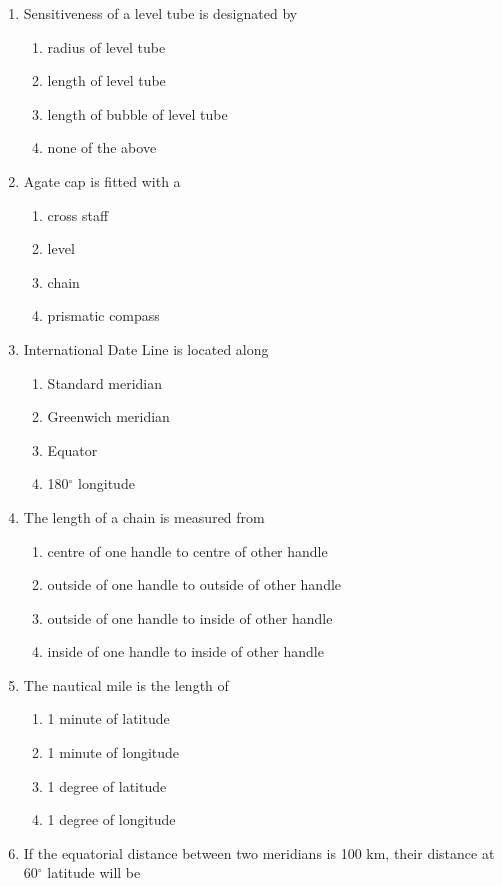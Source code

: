 \documentclass[11pt,a4paper]{article}
\begin{document}
\begin{enumerate}
\begin{enumerate*}[itemjoin=\qquad, label=\Alph*.]
\end{enumerate*}
\item{Sensitiveness of a level tube is designated by}
\begin{enumerate}[label=\Alph*.]
\item{radius of level tube}
\item{length of level tube}
\item{length of bubble of level tube}
\item{none of the above}
\end{enumerate}
\item{Agate cap is fitted with a}
\begin{enumerate}[label=\Alph*.]
\item{cross staff}
\item{level}
\item{chain}
\item{prismatic compass}
\end{enumerate}
\item{International Date Line is located along}
\begin{enumerate}[label=\Alph*.]
\item{Standard meridian}
\item{Greenwich meridian}
\item{Equator}
\item{180$^\circ$ longitude}
\end{enumerate}
\item{The length of a chain is measured from}
\begin{enumerate}[label=\Alph*.]
\item{centre of one handle to centre of other handle}
\item{outside of one handle to outside of other handle}
\item{outside of one handle to inside of other handle}
\item{inside of one handle to inside of other handle}
\end{enumerate}
\item{The nautical mile is the length of}
\begin{enumerate}[label=\Alph*.]
\item{1 minute of latitude}
\item{1 minute of longitude}
\item{1 degree of latitude}
\item{1 degree of longitude}
\end{enumerate}
\item{If the equatorial distance between two meridians is 100 km, their distance at 60$^\circ$ latitude will be
}
\end{enumerate}
\end{document}
